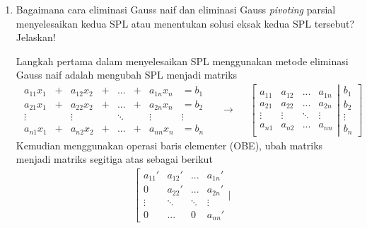 \documentclass[12pt]{article}
\begin{document}
\begin{enumerate}
    \item {
        Bagaimana cara eliminasi Gauss naif dan eliminasi Gauss \emph{pivoting} parsial menyelesaikan kedua SPL atau menentukan solusi eksak kedua SPL tersebut? Jelaskan! \bigskip

        Langkah pertama dalam menyelesaikan SPL menggunakan metode eliminasi Gauss naif adalah mengubah SPL menjadi matriks
        \begin{align*}
            \begin{matrix}
                a_{11}x_1 & + & a_{12}x_2 & + & ...   & + & a_{1n}x_n & = b_1 \\
                a_{21}x_1 & + & a_{22}x_2 & + & ...   & + & a_{2n}x_n & = b_2 \\
                \vdots    &   & \vdots    &   & \ddots&   & \vdots      & \vdots \\
                a_{n1}x_1 & + & a_{n2}x_2 & + &...    & + & a_{nn}x_n & = b_n 
            \end{matrix} && \rightarrow & & 
            \left[\begin{matrix}
                a_{11} & a_{12} & ...   & a_{1n} \\
                a_{21} & a_{22} & ...   & a_{2n} \\
                \vdots & \vdots & \ddots& \vdots \\
                a_{n1} & a_{n2} &...    & a_{nn}
            \end{matrix}\left|\begin{matrix}
                b_1 \\
                b_2 \\
                \vdots \\
                b_n
            \end{matrix}\right.\right]
        \end{align*}
        Kemudian menggunakan operasi baris elementer (OBE), ubah matriks menjadi matriks segitiga atas sebagai berikut
        \begin{align*}
            \left[\begin{matrix}
                a_{11}' & a_{12}'   & ...   & a_{1n}' \\
                0       & a_{22}'   & ...   & a_{2n}' \\
                \vdots  & \ddots    & \ddots& \vdots \\
                0       & ...       & 0     & a_{nn}'
            \end{matrix}\left|\begin{matrix}

\end{matrix}
\end{align*}}
\end{enumerate}
\end{document}
